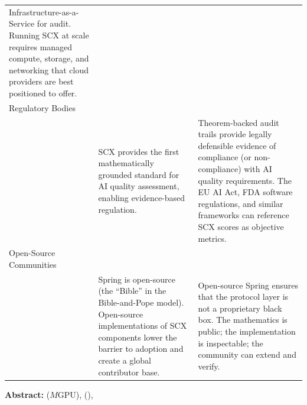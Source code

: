 \documentclass[12pt,a4paper]{article}
\theoremstyle{remark}
\begin{document}
\begin{longtable}{@{}p{3cm} p{5cm} p{6cm}@{}}
Infrastructure-as-a-Service for audit. Running SCX at scale requires managed 
compute, storage, and networking that cloud providers are best positioned to offer. \\
\addlinespace
Regulatory Bodies\\ &
SCX provides the first mathematically grounded standard for AI quality 
assessment, enabling evidence-based regulation. &
Theorem-backed audit trails provide legally defensible evidence of compliance 
(or non-compliance) with AI quality requirements. The EU AI Act, FDA software 
regulations, and similar frameworks can reference SCX scores as objective metrics. \\
\addlinespace
Open-Source Communities\\ &
Spring is open-source (the ``Bible'' in the Bible-and-Pope model). 
Open-source implementations of SCX components lower the barrier to adoption 
and create a global contributor base. &
Open-source Spring ensures that the protocol layer is not a proprietary black 
box. The mathematics is public; the implementation is inspectable; the 
community can extend and verify. \\
\bottomrule
\end{longtable}
\noindent\textbf{Abstract: }
($M$GPU), (), 
\end{document}
